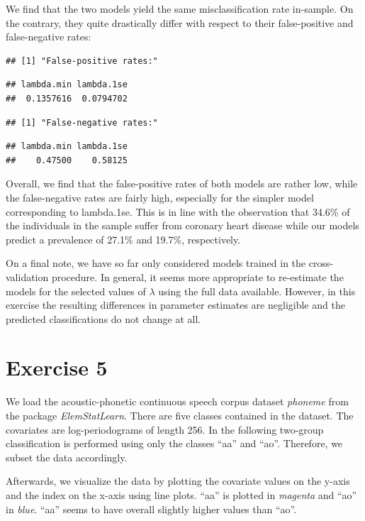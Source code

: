 \documentclass[
]{article}
\begin{document}
We find that the two models yield the same misclassification rate
in-sample. On the contrary, they quite drastically differ with respect
to their false-positive and false-negative rates:

\begin{verbatim}
## [1] "False-positive rates:"
\end{verbatim}

\begin{verbatim}
## lambda.min lambda.1se 
##  0.1357616  0.0794702
\end{verbatim}

\begin{verbatim}
## [1] "False-negative rates:"
\end{verbatim}

\begin{verbatim}
## lambda.min lambda.1se 
##    0.47500    0.58125
\end{verbatim}

Overall, we find that the false-positive rates of both models are rather
low, while the false-negative rates are fairly high, especially for the
simpler model corresponding to lambda.1se. This is in line with the
observation that 34.6\% of the individuals in the sample suffer from
coronary heart disease while our models predict a prevalence of 27.1\%
and 19.7\%, respectively.

On a final note, we have so far only considered models trained in the
cross-validation procedure. In general, it seems more appropriate to
re-estimate the models for the selected values of \(\lambda\) using the
full data available. However, in this exercise the resulting differences
in parameter estimates are negligible and the predicted classifications
do not change at all.

\newpage

\hypertarget{exercise-5}{%
\section{Exercise 5}\label{exercise-5}}

We load the acoustic-phonetic continuous speech corpus dataset
\textit{phoneme} from the package \textit{ElemStatLearn}. There are five
classes contained in the dataset. The covariates are log-periodograms of
length 256. In the following two-group classification is performed using
only the classes ``aa'' and ``ao''. Therefore, we subset the data
accordingly.

Afterwards, we visualize the data by plotting the covariate values on
the y-axis and the index on the x-axis using line plots. ``aa'' is
plotted in \textit{magenta} and ``ao'' in \textit{blue}. ``aa'' seems to
have overall slightly higher values than ``ao''.
\end{document}
